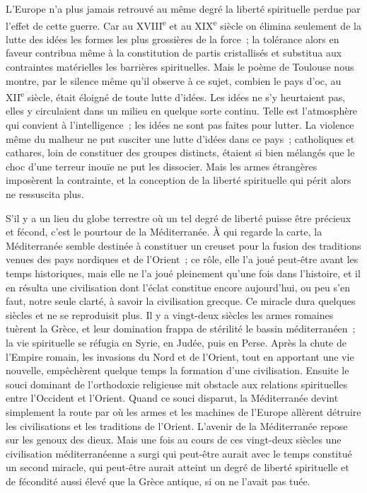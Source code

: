 \documentclass[french,twoside]{book} %
\begin{document}
L'Europe n'a plus jamais retrouvé au même degré la liberté spirituelle perdue par l'effet de cette guerre. Car au XVIII\textsuperscript{e} et au XIX\textsuperscript{e} siècle on élimina seulement de la lutte des idées les formes les plus grossières de la force ; la tolérance alors en faveur contribua même à la constitution de partis cristallisés et substitua aux contraintes matérielles les barrières spirituelles. Mais le poème de Toulouse nous montre, par le silence même qu'il observe à ce sujet, combien le pays d'oc, au XII\textsuperscript{e} siècle, était éloigné de toute lutte d'idées. Les idées ne s'y heurtaient pas, elles y circulaient dans un milieu en quelque sorte continu. Telle est l'atmosphère qui convient à l'intelligence ; les idées ne sont pas faites pour lutter. La violence même du malheur ne put susciter une lutte d'idées dans ce pays ; catholiques et cathares, loin de constituer des groupes distincts, étaient si bien mélangés que le choc d'une terreur inouïe ne put les dissocier. Mais les armes étrangères imposèrent la contrainte, et la conception de la liberté spirituelle qui périt alors ne ressuscita plus.\par
S'il y a un lieu du globe terrestre où un tel degré de liberté puisse être précieux et fécond, c'est le pourtour de la Méditerranée. À qui regarde la carte, la Méditerranée semble destinée à constituer un creuset pour la fusion des traditions venues des pays nordiques et de l'Orient ; ce rôle, elle l'a joué peut-être avant les temps historiques, mais elle ne l'a joué pleinement qu'une fois dans l'histoire, et il en résulta une civilisation dont l'éclat constitue encore aujourd'hui, ou peu s'en faut, notre seule clarté, à savoir la civilisation grec­que. Ce miracle dura quelques siècles et ne se reproduisit plus. Il y a vingt-deux siècles les armes romaines tuèrent la Grèce, et leur domination frappa de stérilité le bassin méditerranéen ; la vie spirituelle se réfugia en Syrie, en Judée, puis en Perse. Après la chute de l'Empire romain, les invasions du Nord et de l'Orient, tout en apportant une vie nouvelle, empêchèrent quelque temps la formation d'une civilisation. Ensuite le souci dominant de l'orthodoxie religieuse mit obstacle aux relations spirituelles entre l'Occident et l'Orient. Quand ce souci disparut, la Méditerranée devint simplement la route par où les armes et les machines de l'Europe allèrent détruire les civilisations et les traditions de l'Orient. L'avenir de la Méditerranée repose sur les genoux des dieux. Mais une fois au cours de ces vingt-deux siècles une civilisation méditerranéenne a surgi qui peut-être aurait avec le temps constitué un second miracle, qui peut-être aurait atteint un degré de liberté spirituelle et de fécondité aussi élevé que la Grèce antique, si on ne l'avait pas tuée.\par
\end{document}
